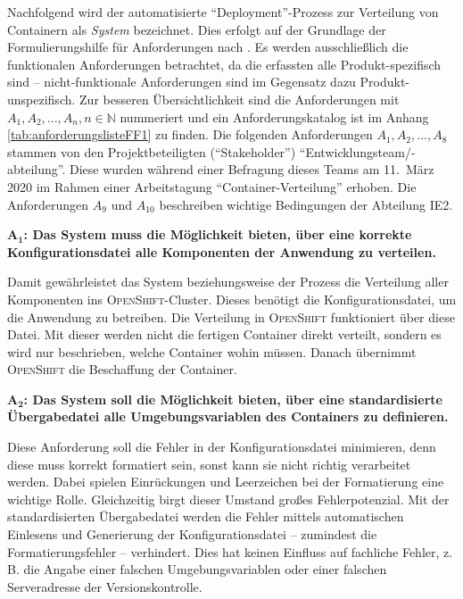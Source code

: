 Nachfolgend wird der automatisierte \enquote{Deployment}-Prozess zur Verteilung von Containern als \textit{System} bezeichnet. Dies erfolgt auf der Grundlage der Formulierungshilfe für Anforderungen nach \cite{rupp_formulierungsregel_2020}. Es werden ausschließlich die funktionalen Anforderungen \autocite[vgl.][]{international_organization_for_standardization_isoiec_2011,} betrachtet, da die erfassten alle Produkt-spezifisch sind -- nicht-funktionale Anforderungen sind im Gegensatz dazu Produkt-unspezifisch. Zur besseren Übersichtlichkeit sind die Anforderungen mit $A_{1}, A_{2}, ..., A_{n}, n \in \mathbb{N}$ nummeriert und ein Anforderungskatalog ist im Anhang \vref{tab:anforderungslisteFF1} zu finden. Die folgenden Anforderungen $A_{1}, A_{2}, ..., A_{8}$ stammen von den Projektbeteiligten (\enquote{Stakeholder}) \enquote{Entwicklungsteam/-abteilung}. Diese wurden während einer Befragung dieses Teams am 11.~März 2020 im Rahmen einer Arbeitstagung \enquote{Container-Verteilung} erhoben. Die Anforderungen $A_{9}$ und $A_{10}$ beschreiben wichtige Bedingungen der Abteilung \ac{IE2}. 
\par 
$\mathbf{A_{1}}$\textbf{: Das System muss die Möglichkeit bieten, über eine korrekte Konfigurationsdatei alle Komponenten der Anwendung zu verteilen.}
\par
Damit gewährleistet das System beziehungsweise der Prozess die Verteilung aller Komponenten ins \textsc{OpenShift}-Cluster. Dieses benötigt die Konfigurationsdatei, um die Anwendung zu betreiben. Die Verteilung in \textsc{OpenShift} funktioniert über diese Datei. Mit dieser werden nicht die fertigen Container direkt verteilt, sondern es wird nur beschrieben, welche Container wohin müssen. Danach übernimmt \textsc{OpenShift} die Beschaffung der Container.
\par
$\mathbf{A_{2}}$\textbf{: Das System soll die Möglichkeit bieten, über eine standardisierte Übergabedatei alle Umgebungsvariablen des Containers zu definieren.}
\par
Diese Anforderung soll die Fehler in der Konfigurationsdatei minimieren, denn diese muss korrekt formatiert sein, sonst kann sie nicht richtig verarbeitet werden. Dabei spielen Einrückungen und Leerzeichen bei der Formatierung eine wichtige Rolle. Gleichzeitig birgt dieser Umstand großes Fehlerpotenzial. Mit der standardisierten Übergabedatei werden die Fehler mittels automatischen Einlesens und Generierung der Konfigurationsdatei -- zumindest die Formatierungsfehler -- verhindert. Dies hat keinen Einfluss auf fachliche Fehler, z.\,B. die Angabe einer falschen Umgebungsvariablen oder einer falschen Serveradresse der Versionskontrolle.

